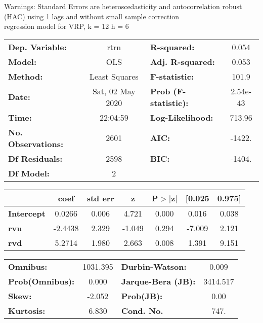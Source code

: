Warnings: \newline
 [1] Standard Errors are heteroscedasticity and autocorrelation robust (HAC) using 1 lags and without small sample correction\\ 

regression model for VRP, k = 12 h = 6\begin{center}
\begin{tabular}{lclc}
\toprule
\textbf{Dep. Variable:}    &       rtrn       & \textbf{  R-squared:         } &     0.054   \\
\textbf{Model:}            &       OLS        & \textbf{  Adj. R-squared:    } &     0.053   \\
\textbf{Method:}           &  Least Squares   & \textbf{  F-statistic:       } &     101.9   \\
\textbf{Date:}             & Sat, 02 May 2020 & \textbf{  Prob (F-statistic):} &  2.54e-43   \\
\textbf{Time:}             &     22:04:59     & \textbf{  Log-Likelihood:    } &    713.96   \\
\textbf{No. Observations:} &        2601      & \textbf{  AIC:               } &    -1422.   \\
\textbf{Df Residuals:}     &        2598      & \textbf{  BIC:               } &    -1404.   \\
\textbf{Df Model:}         &           2      & \textbf{                     } &             \\
\bottomrule
\end{tabular}
\begin{tabular}{lcccccc}
                   & \textbf{coef} & \textbf{std err} & \textbf{z} & \textbf{P$> |$z$|$} & \textbf{[0.025} & \textbf{0.975]}  \\
\midrule
\textbf{Intercept} &       0.0266  &        0.006     &     4.721  &         0.000        &        0.016    &        0.038     \\
\textbf{rvu}       &      -2.4438  &        2.329     &    -1.049  &         0.294        &       -7.009    &        2.121     \\
\textbf{rvd}       &       5.2714  &        1.980     &     2.663  &         0.008        &        1.391    &        9.151     \\
\bottomrule
\end{tabular}
\begin{tabular}{lclc}
\textbf{Omnibus:}       & 1031.395 & \textbf{  Durbin-Watson:     } &    0.009  \\
\textbf{Prob(Omnibus):} &   0.000  & \textbf{  Jarque-Bera (JB):  } & 3414.517  \\
\textbf{Skew:}          &  -2.052  & \textbf{  Prob(JB):          } &     0.00  \\
\textbf{Kurtosis:}      &   6.830  & \textbf{  Cond. No.          } &     747.  \\
\bottomrule
\end{tabular}
\end{center}

